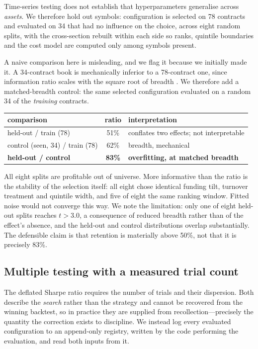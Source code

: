 \documentclass[11pt,letterpaper]{article}
\begin{document}
Time-series testing does not establish that hyperparameters generalise across
\emph{assets}. We therefore hold out symbols: configuration is selected on 78
contracts and evaluated on 34 that had no influence on the choice, across eight
random splits, with the cross-section rebuilt within each side so ranks,
quintile boundaries and the cost model are computed only among symbols present.

A naive comparison here is misleading, and we flag it because we initially made
it. A 34-contract book is mechanically inferior to a 78-contract one, since
information ratio scales with the square root of breadth \citep{grinold1989}.
We therefore add a matched-breadth control: the same selected configuration
evaluated on a random 34 of the \emph{training} contracts.

\begin{center}
\begin{tabular}{lcl}
\toprule
comparison & ratio & interpretation \\
\midrule
held-out / train (78) & 51\% & conflates two effects; not interpretable \\
control (seen, 34) / train (78) & 62\% & breadth, mechanical \\
\textbf{held-out / control} & \textbf{83\%} & \textbf{overfitting, at matched breadth} \\
\bottomrule
\end{tabular}
\end{center}

All eight splits are profitable out of universe. More informative than the ratio
is the stability of the selection itself: all eight chose identical funding
tilt, turnover treatment and quintile width, and five of eight the same ranking
window. Fitted noise would not converge this way. We note the limitation: only
one of eight held-out splits reaches $t > 3.0$, a consequence of reduced breadth
rather than of the effect's absence, and the held-out and control distributions
overlap substantially. The defensible claim is that retention is materially
above 50\%, not that it is precisely 83\%.

\subsection{Multiple testing with a measured trial count}

The deflated Sharpe ratio \citep{bailey2014} requires the number of trials and
their dispersion. Both describe the \emph{search} rather than the strategy and
cannot be recovered from the winning backtest, so in practice they are supplied
from recollection---precisely the quantity the correction exists to discipline.
We instead log every evaluated configuration to an append-only registry, written
by the code performing the evaluation, and read both inputs from it.
\end{document}
